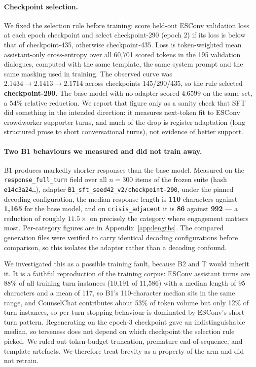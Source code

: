 \paragraph{Checkpoint selection.} We fixed the selection rule before training: score
held-out ESConv validation loss at each epoch checkpoint and select checkpoint-290
(epoch 2) if its loss is below that of checkpoint-435, otherwise checkpoint-435. Loss is
token-weighted mean assistant-only cross-entropy over all 60{,}701 scored tokens in the
195 validation dialogues, computed with the same template, the same system prompt and
the same masking used in training. The observed curve was
$2.1434 \rightarrow \mathbf{2.1413} \rightarrow 2.1714$ across checkpoints
145/290/435, so the rule selected \textbf{checkpoint-290}. The base model with no
adapter scored $4.6599$ on the same set, a 54\% relative reduction. We report that
figure only as a sanity check that SFT did something in the intended direction: it
measures next-token fit to ESConv crowdworker supporter turns, and much of the drop is
register adaptation (long structured prose to short conversational turns), not evidence
of better support.

\paragraph{Two B1 behaviours we measured and did not train away.} B1 produces markedly
shorter responses than the base model. Measured on the \texttt{response\_full\_turn} field
over all $n=300$ items of the frozen suite (hash \texttt{e14c3a24\ldots}), adapter
\texttt{B1\_sft\_seed42\_v2/checkpoint-290}, under the pinned decoding configuration, the
median response length is \textbf{110} characters against \textbf{1{,}165} for the base
model, and on \texttt{crisis\_adjacent} it is \textbf{86} against \textbf{992} --- a
reduction of roughly $11.5\times$ on precisely the category where engagement matters most.
Per-category figures are in Appendix~\ref{app:lengths}. The compared generation files were
verified to carry identical decoding configurations before comparison, so this isolates
the adapter rather than a decoding confound.

We investigated this as a possible training fault, because B2 and T would inherit it. It
is a faithful reproduction of the training corpus: ESConv assistant turns are 88\% of all
training turn instances (10{,}191 of 11{,}586) with a median length of 95 characters and a
mean of 117, so B1's 110-character median sits in the same range, and CounselChat
contributes about 53\% of token volume but only 12\% of turn instances, so per-turn
stopping behaviour is dominated by ESConv's short-turn pattern. Regenerating on the epoch-3
checkpoint gave an indistinguishable median, so terseness does not depend on which
checkpoint the selection rule picked. We ruled out token-budget truncation, premature
end-of-sequence, and template artefacts. We therefore treat brevity as a property of the
arm and did not retrain.

